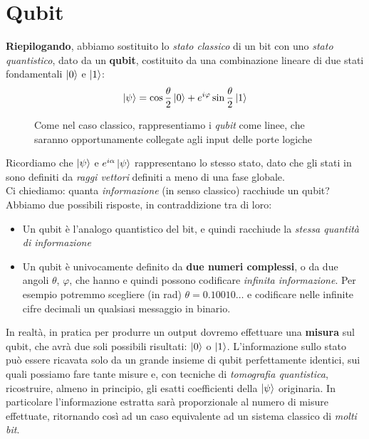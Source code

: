 \documentclass[../../InformazioneQuantistica.tex]{subfiles}
\begin{document}
\section{Qubit}
\textbf{Riepilogando}, abbiamo sostituito lo \textit{stato classico} di un bit con uno \textit{stato quantistico}, dato da un \textbf{qubit}, costituito da una combinazione lineare di due stati fondamentali $\Ket{0}$ e $\Ket{1}$:
\begin{align*}
\Ket{\psi} = \cos\frac{\theta}{2} \Ket{0} + e^{i\varphi} \sin\frac{\theta}{2}\Ket{1}
\end{align*}


\begin{figure}[H]
\centering

\caption{Come nel caso classico, rappresentiamo i \textit{qubit} come linee, che saranno opportunamente collegate agli input delle porte logiche\label{fig:qubit-righe}}
\end{figure}


Ricordiamo che $\Ket{\psi}$ e $e^{i\alpha}\Ket{\psi}$ rappresentano lo stesso stato, dato che gli stati in \MQ sono definiti da \textit{raggi vettori} definiti a meno di una fase globale.\\

Ci chiediamo: quanta \textit{informazione} (in senso classico) racchiude un qubit? Abbiamo due possibili risposte, in contraddizione tra di loro:
\begin{itemize}
\item Un qubit è l'analogo quantistico del bit, e quindi racchiude la \textit{stessa quantità di informazione}
\item Un qubit è univocamente definito da \textbf{due numeri complessi}, o da due angoli $\theta$, $\varphi$, che hanno  e quindi possono codificare \textit{infinita informazione}. Per esempio potremmo scegliere (in \si{\radian}) $\theta=0.10010\dots$ e codificare nelle infinite cifre decimali un qualsiasi messaggio in binario.
\end{itemize}
In realtà, in pratica per produrre un output dovremo effettuare una \textbf{misura} sul qubit, che avrà due soli possibili risultati: $\Ket{0}$ o $\Ket{1}$. L'informazione sullo stato può essere ricavata solo da un grande insieme di qubit perfettamente identici, sui quali possiamo fare tante misure e, con tecniche di \textit{tomografia quantistica}, ricostruire, almeno in principio, gli esatti coefficienti della $\Ket{\psi}$ originaria. In particolare l'informazione estratta sarà proporzionale al numero di misure effettuate, ritornando così ad un caso equivalente ad un sistema classico di \textit{molti bit}.\\
\end{document}
